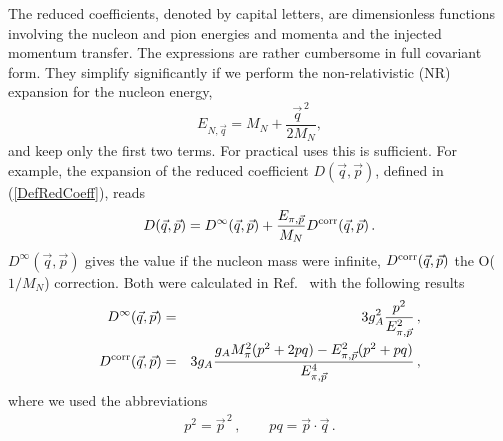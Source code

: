 \documentclass[11pt,prd,aps,showpacs,eqsecnum,floatfix,nofootinbib,preprint,tightenlines]{revtex4}
\newcommand{\pref}[1]{(\ref{#1})}
\newcommand{\ENq}{E_{N,\vec{q}}}
\newcommand{\Epip}{E_{\pi, \vec{p}}}
\begin{document}
The reduced coefficients, denoted by capital letters, are dimensionless functions involving the nucleon and pion energies and momenta and the injected momentum transfer.
The expressions are rather cumbersome in full covariant form. They simplify significantly if we perform the non-relativistic (NR) expansion for the nucleon energy, 
\begin{equation}\label{NRexpansion}
\ENq = M_N+\frac{\vec{q}^{\,2}}{2M_N} ,
\end{equation}
and keep only the first two terms. For practical uses this is sufficient. 
For example, the expansion of the reduced coefficient $D(\vec{q},\vec{p})$, defined in \pref{DefRedCoeff}, reads
\begin{equation}\label{DefNRExp}
D(\vec{q},\vec{p}) =D^{\infty}(\vec{q},\vec{p}) + \frac{\Epip}{M_N}D^{\rm corr}(\vec{q},\vec{p})\,.
\end{equation}
$D^{\infty}(\vec{q},\vec{p}) $ gives the value if the nucleon mass were infinite, $D^{\rm corr}(\vec{q},\vec{p})$ the O($1/M_N$) correction. Both were calculated in Ref.\ \cite{Bar:2018xyi} with the following results
\begin{eqnarray}
D^{\infty}(\vec{q},\vec{p}) & = & 3g_A^2\frac{ p^2}{\Epip^2}\,,\\
D^{\rm corr}(\vec{q},\vec{p}) & = & 3g_A\frac{g_A M_{\pi}^2 (p^2+2pq)-\Epip^2 (p^2+pq)}{\Epip^4}\,,
\end{eqnarray}
where we used the abbreviations
\begin{eqnarray}
p^2=\vec{p}^{\,2}\,,\qquad pq=\vec{p}\cdot\vec{q}\,.
\end{eqnarray}
\end{document}
